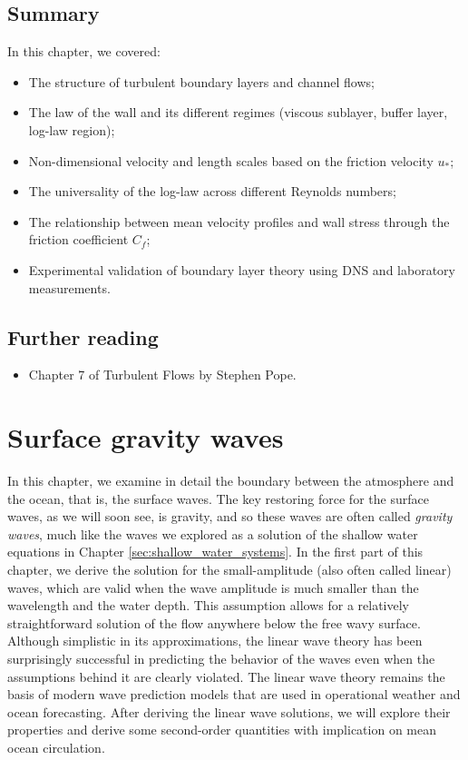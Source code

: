 \documentclass[12pt]{article}
\numberwithin{equation}{section}
\numberwithin{figure}{section}
\numberwithin{table}{section}
\begin{document}
\subsection*{Summary}

In this chapter, we covered:

\begin{itemize}
  \item The structure of turbulent boundary layers and channel flows;
  \item The law of the wall and its different regimes (viscous sublayer, buffer layer, log-law region);
  \item Non-dimensional velocity and length scales based on the friction velocity $u_*$;
  \item The universality of the log-law across different Reynolds numbers;
  \item The relationship between mean velocity profiles and wall stress through the friction coefficient $C_f$;
  \item Experimental validation of boundary layer theory using DNS and laboratory measurements.
\end{itemize}

\subsection*{Further reading}

\begin{itemize}
  \item Chapter 7 of Turbulent Flows by Stephen Pope.
\end{itemize}

\newpage
\section{Surface gravity waves}
\label{sec:surface_gravity_waves}

In this chapter, we examine in detail the boundary between the atmosphere and
the ocean, that is, the surface waves.
The key restoring force for the surface waves, as we will soon see, is gravity,
and so these waves are often called \textit{gravity waves},
much like the waves we explored as a solution of the shallow water equations in
Chapter \ref{sec:shallow_water_systems}.
In the first part of this chapter, we derive the solution for the
small-amplitude (also often called linear) waves, which are valid when the
wave amplitude is much smaller than the wavelength and the water depth.
This assumption allows for a relatively straightforward solution of the flow
anywhere below the free wavy surface.
Although simplistic in its approximations, the linear wave theory has been
surprisingly successful in predicting the behavior of the waves even when the
assumptions behind it are clearly violated.
The linear wave theory remains the basis of modern wave prediction models that
are used in operational weather and ocean forecasting.
After deriving the linear wave solutions, we will explore their properties
and derive some second-order quantities with implication on mean ocean
circulation.
\end{document}
